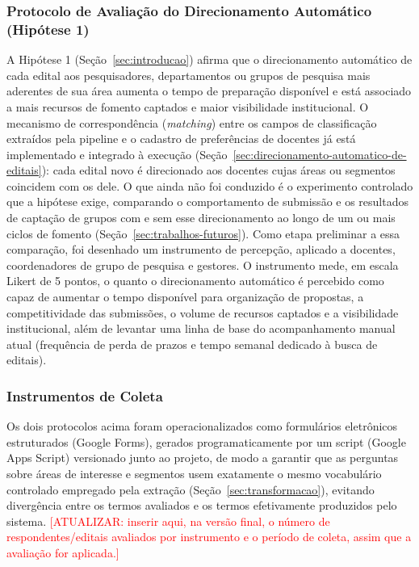 \documentclass[12pt]{article}
\begin{document}
  \subsubsection{Protocolo de Avaliação do Direcionamento Automático (Hipótese 1)}\label{sec:protocolo-de-avaliacao-do-direcionamento-automatico-hipotese-1}
  A Hipótese 1 (Seção~\ref{sec:introducao}) afirma que o direcionamento automático de cada edital aos pesquisadores, departamentos ou grupos de pesquisa mais aderentes de sua área aumenta o tempo de preparação disponível e está associado a mais recursos de fomento captados e maior visibilidade institucional. O mecanismo de correspondência (\emph{matching}) entre os campos de classificação extraídos pela pipeline e o cadastro de preferências de docentes já está implementado e integrado à execução (Seção~\ref{sec:direcionamento-automatico-de-editais}): cada edital novo é direcionado aos docentes cujas áreas ou segmentos coincidem com os dele. O que ainda não foi conduzido é o experimento controlado que a hipótese exige, comparando o comportamento de submissão e os resultados de captação de grupos com e sem esse direcionamento ao longo de um ou mais ciclos de fomento (Seção~\ref{sec:trabalhos-futuros}). Como etapa preliminar a essa comparação, foi desenhado um instrumento de percepção, aplicado a docentes, coordenadores de grupo de pesquisa e gestores. O instrumento mede, em escala Likert de 5 pontos, o quanto o direcionamento automático é percebido como capaz de aumentar o tempo disponível para organização de propostas, a competitividade das submissões, o volume de recursos captados e a visibilidade institucional, além de levantar uma linha de base do acompanhamento manual atual (frequência de perda de prazos e tempo semanal dedicado à busca de editais).

  \subsubsection{Instrumentos de Coleta}\label{sec:instrumentos-de-coleta}
  Os dois protocolos acima foram operacionalizados como formulários eletrônicos estruturados (Google Forms), gerados programaticamente por um script (Google Apps Script) versionado junto ao projeto, de modo a garantir que as perguntas sobre áreas de interesse e segmentos usem exatamente o mesmo vocabulário controlado empregado pela extração (Seção~\ref{sec:transformacao}), evitando divergência entre os termos avaliados e os termos efetivamente produzidos pelo sistema. \textcolor{red}{[ATUALIZAR: inserir aqui, na versão final, o número de respondentes/editais avaliados por instrumento e o período de coleta, assim que a avaliação for aplicada.]}
\end{document}
